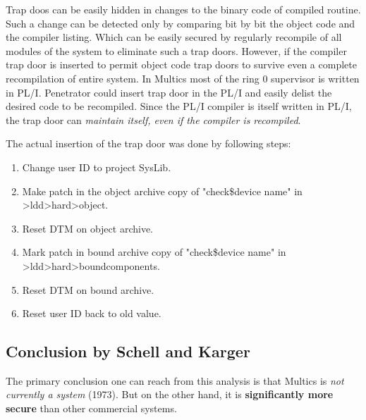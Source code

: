 Trap doos can be easily hidden in changes to the binary code of compiled routine. Such a change can be 
detected only by comparing bit by bit the object code and the compiler listing. Which can be easily secured 
by regularly recompile of all modules of the system to eliminate such a trap doors.
However, if the compiler trap door is inserted to permit object code trap doors to survive even a complete 
recompilation of entire system. 
In Multics most of the ring 0 supervisor is written in PL/I. Penetrator could insert trap door in the PL/I and 
easily delist the desired code to be recompiled.
Since the PL/I compiler is itself written in PL/I, the trap door can \textit{maintain itself, even if the 
compiler is recompiled}.

The actual insertion of the trap door was done by following steps:
\begin{enumerate}
    \item Change user ID to project SysLib.
    \item Make patch in the object archive copy of "check\$device\underline{} name" in >ldd>hard>object.
    \item Reset DTM on object archive.
    \item Mark patch in bound archive copy of "check\$device\underline{} name" in >ldd>hard>bound\underline{}components.
    \item Reset DTM on bound archive.
    \item Reset user ID back to old value.
\end{enumerate}


\subsection{Conclusion by Schell and Karger}

The primary conclusion one can reach from this analysis is that Multics is \textit{not currently a system} (1973).
But on the other hand, it is \textbf{significantly more secure} than other commercial systems.



%
%
%